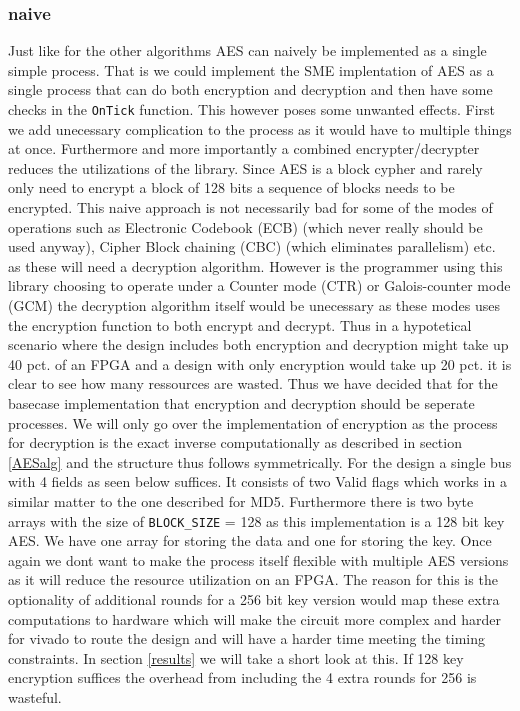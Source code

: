 \documentclass[a4paper]{article}
\begin{document}
\begin{enumerate}
\subsubsection{naive}
\label{AESnaive}
Just like for the other algorithms AES can naively be implemented as a single simple process. That is we could implement the SME implentation of AES as a single process that can do both encryption and decryption and then have some checks in the \texttt{OnTick} function. This however poses some unwanted effects. First we add unecessary complication to the process as it would have to multiple things at once. Furthermore and more importantly a combined encrypter/decrypter reduces the utilizations of the library. Since AES is a block cypher and rarely only need to encrypt a block of 128 bits a sequence of blocks needs to be encrypted. This naive approach is not necessarily bad for some of the modes of operations such as Electronic Codebook (ECB) (which never really should be used anyway), Cipher Block chaining (CBC) (which eliminates parallelism) etc. as these will need a decryption algorithm. However is the programmer using this library choosing to operate under a Counter mode (CTR) or Galois-counter mode (GCM) the decryption algorithm itself would be unecessary as these modes uses the encryption function to both encrypt and decrypt. Thus in a hypotetical scenario where the design includes both encryption and decryption might take up 40 pct. of an FPGA and a design with only encryption would take up 20 pct. it is clear to see how many ressources are wasted. Thus we have decided that for the basecase implementation that encryption and decryption should be seperate processes. We will only go over the implementation of encryption as the process for decryption is the exact inverse computationally as described in section \ref{AESalg} and the structure thus follows symmetrically. For the design a single bus with 4 fields as seen below suffices. It consists of two Valid flags which works in a similar matter to the one described for MD5. Furthermore there is two byte arrays with the size of \texttt{BLOCK\_SIZE} = 128 as this implementation is a 128 bit key AES. We have one array for storing the data and one for storing the key. Once again we dont want to make the process itself flexible with multiple AES versions as it will reduce the resource utilization on an FPGA. The reason for this is the optionality of additional rounds for a 256 bit key version would map these extra computations to hardware which will make the circuit more complex and harder for vivado to route the design and will have a harder time meeting the timing constraints. In section \ref{results} we will take a short look at this. If 128 key encryption suffices the overhead from including the 4 extra rounds for 256 is wasteful.


\end{enumerate}
\end{document}

